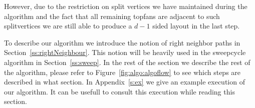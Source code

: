   However, due to the restriction on split vertices we have maintained during the algorithm and the fact that all remaining topfans are adjacent to such splitvertices we are still able to produce a $d-1$ sided layout in the last step.

  To describe our algorithm we introduce the notion of right neighbor paths in Section~\ref{ss:rightNeighbour}. This notion will be heavily used in the sweepcycle algorithm in Section~\ref{ss:sweep}. In the rest of the section we describe the rest of the algorithm, please refer to Figure~\ref{fig:algo:algoflow} to see which steps are described in what section.
  In Appendix~\ref{s:ex} we give an example execution of our algorithm. It can be usefull to consult this execution while reading this section.
